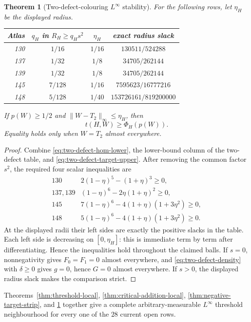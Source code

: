 \documentclass[11pt]{article}
\newtheorem{theorem}{Theorem}[section]
\begin{document}
\begin{theorem}[Two-defect-colouring $L^\infty$ stability]
\label{thm:two-defect-local}
For the following rows, let $\eta_H$ be the displayed radius.
\begin{center}
\begin{tabular}{r|c|c|c}
Atlas&$q_H$ in $R_H\geq q_Hs^2$&$\eta_H$&exact radius slack\\ \hline
130&$1/16$&$1/16$&$130511/524288$\\
137&$1/32$&$1/8$&$34705/262144$\\
139&$1/32$&$1/8$&$34705/262144$\\
145&$7/128$&$1/16$&$7595623/16777216$\\
148&$5/128$&$1/40$&$153726161/819200000$
\end{tabular}
\end{center}
If $p(W)\geq1/2$ and
$\lVert W-T_2\rVert_\infty\leq\eta_H$, then
\[
 t(H,W)\geq\Phi_H(p(W)).
\]
Equality holds only when $W=T_2$ almost everywhere.
\end{theorem}

\begin{proof}
Combine \eqref{eq:two-defect-hom-lower}, the lower-bound column of the
two-defect table, and \eqref{eq:two-defect-target-upper}.  After removing
the common factor $s^2$, the required four scalar inequalities are
\[
\begin{array}{c|l}
130&2(1-\eta)^5-(1+\eta)^3\geq0,\\
137,139&(1-\eta)^6-2\eta(1+\eta)^2\geq0,\\
145&7(1-\eta)^6-4(1+\eta)(1+3\eta^2)\geq0,\\
148&5(1-\eta)^6-4(1+\eta)(1+3\eta^2)\geq0.
\end{array}
\]
At the displayed radii their left sides are exactly the positive slacks in
the table.  Each left side is decreasing on $[0,\eta_H]$: this is immediate
term by term after differentiating.  Hence the inequalities hold throughout
the claimed balls.  If $s=0$, nonnegativity gives $F_0=F_1=0$ almost
everywhere, and \eqref{eq:two-defect-density} with $\delta\geq0$ gives
$g=0$, hence $G=0$ almost everywhere.  If $s>0$, the displayed radius slack
makes the comparison strict.
\end{proof}

Theorems~\ref{thm:threshold-local},
\ref{thm:critical-addition-local}, \ref{thm:negative-target-strip}, and
\ref{thm:two-defect-local} together give a complete arbitrary-measurable
$L^\infty$ threshold neighbourhood for every one of the $28$ current open
rows.
\end{document}
